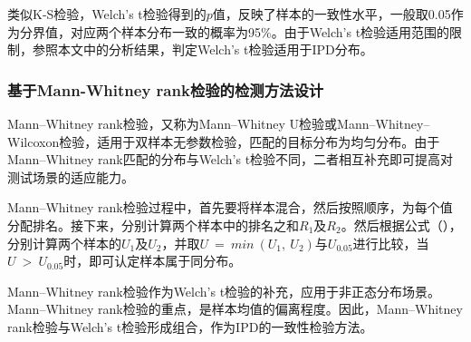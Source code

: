 类似K-S检验，Welch's t检验得到的$p$值，反映了样本的一致性水平，一般取0.05作为分界值，对应两个样本分布一致的概率为95\%。由于Welch's t检验适用范围的限制，参照本文中的分析结果，判定Welch's t检验适用于IPD分布。

\subsubsection{基于Mann-Whitney rank检验的检测方法设计}
\label{chap:analyze:statistical:test:mw}

Mann–Whitney rank检验，又称为Mann–Whitney U检验或Mann–Whitney–Wilcoxon检验，适用于双样本无参数检验，匹配的目标分布为均匀分布。由于Mann–Whitney rank匹配的分布与Welch's t检验不同，二者相互补充即可提高对测试场景的适应能力。


Mann–Whitney rank检验过程中，首先要将样本混合，然后按照顺序，为每个值分配排名。接下来，分别计算两个样本中的排名之和$R_{1}$及$R_{2}$。然后根据公式（），分别计算两个样本的$U_{1}$及$U_{2}$，并取$U\ =\ min\ (U_{1},\ U_{2})$与$U_{0.05}$进行比较，当$U\ >\ U_{0.05}$时，即可认定样本属于同分布。

Mann–Whitney rank检验作为Welch's t检验的补充，应用于非正态分布场景。Mann–Whitney rank检验的重点，是样本均值的偏离程度。因此，Mann–Whitney rank检验与Welch's t检验形成组合，作为IPD的一致性检验方法。


